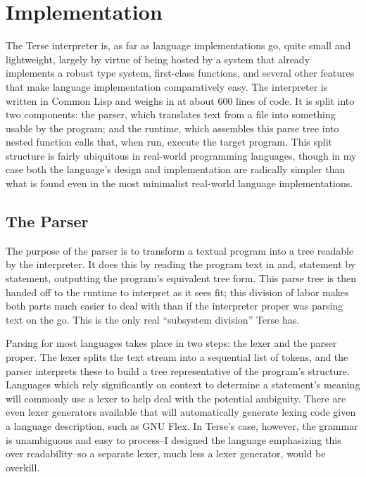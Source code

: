 \documentclass[12pt]{report}
\begin{document}
\section*{Implementation}

The Terse interpreter is, as far as language implementations go, quite
small and lightweight, largely by virtue of being hosted by a system
that already implements a robust type system, first-class functions,
and several other features that make language implementation
comparatively easy. The interpreter is written in Common Lisp and
weighs in at about 600 lines of code. It is split into two components:
the parser, which translates text from a file into something usable by
the program; and the runtime, which assembles this parse tree into
nested function calls that, when run, execute the target program. This
split structure is fairly ubiquitous in real-world programming
languages, though in my case both the language's design and
implementation are radically simpler than what is found even in the
most minimalist real-world language implementations.

\subsection*{The Parser}

The purpose of the parser is to transform a textual program into a
tree readable by the interpreter. It does this by reading the program
text in and, statement by statement, outputting the program's
equivalent tree form. This parse tree is then handed off to the
runtime to interpret as it sees fit; this division of labor makes both
parts much easier to deal with than if the interpreter proper was
parsing text on the go. This is the only real ``subsystem division''
Terse has.

Parsing for most languages takes place in two steps: the lexer and the
parser proper. The lexer splits the text stream into a sequential list
of tokens, and the parser interprets these to build a tree
representative of the program's structure. Languages which rely
significantly on context to determine a statement's meaning will
commonly use a lexer to help deal with the potential ambiguity. There
are even lexer generators available that will automatically generate
lexing code given a language description, such as GNU
Flex\cite{flex}. In Terse's case, however, the grammar is unambiguous
and easy to process--I designed the language emphasizing this over
readability--so a separate lexer, much less a lexer generator, would
be overkill.
\end{document}
